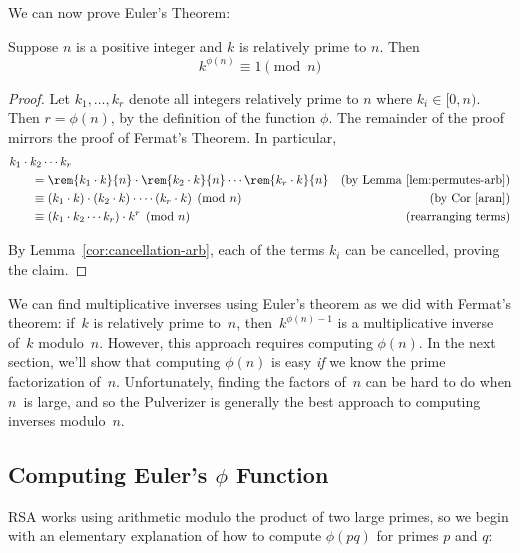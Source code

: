 We can now prove Euler's Theorem:

\begin{theorem}
Suppose $n$ is a positive integer and $k$ is relatively prime to $n$.
Then
\begin{equation*}
    k^{\phi(n)} \equiv 1 \pmod{n}
\end{equation*}
\end{theorem}

\begin{proof}
Let $k_1, \dots, k_r$ denote all integers relatively prime to $n$
where $ k_i\in [0, n)$.  Then $r = \phi(n)$, by the definition of the
  function $\phi$.  The remainder of the proof mirrors the proof of
  Fermat's Theorem.  In particular,
\begin{align*}
\lefteqn{k_1 \cdot k_2 \cdots k_r} \hspace{0.25in} \\
& =
\rem{k_1 \cdot k}{n} \cdot
\rem{k_2 \cdot k}{n} \cdots
\rem{k_r \cdot k}{n} & \text{(by Lemma~\ref{lem:permutes-arb})}
\\
& \equiv
(k_1 \cdot k) \cdot
(k_2 \cdot k) \cdot
\cdots
(k_r \cdot k) \pmod{n} & \text{(by Cor~\ref{aran})}
\\
& \equiv
(k_1 \cdot k_2 \cdots k_r) \cdot k^r \pmod{n} & \text{(rearranging terms)}
\end{align*}

By Lemma~\ref{cor:cancellation-arb}, each of the terms $k_i$ can be
cancelled, proving the claim.
\end{proof}

We can find multiplicative inverses using Euler's theorem as we did
with Fermat's theorem: if~$k$ is relatively prime to~$n$,
then~$k^{\phi(n)-1}$ is a multiplicative inverse of~$k$ modulo~$n$.
However, this approach requires computing $\phi(n)$.  In the next
section, we'll show that computing $\phi(n)$ is easy \emph{if} we know
the prime factorization of~$n$.  Unfortunately, finding the factors
of~$n$ can be hard to do when $n$~is large, and so the Pulverizer is
generally the best approach to computing inverses modulo~$n$.

\subsection{Computing Euler's $\phi$ Function}

RSA works using arithmetic modulo the product of two large primes, so
we begin with an elementary explanation of how to compute $\phi(pq)$
for primes $p$ and $q$:

